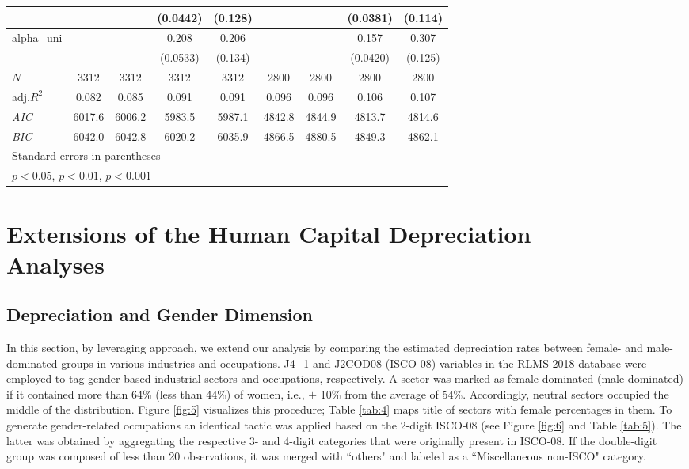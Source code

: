 \documentclass[12pt,a4paper]{article}
\numberwithin{equation}{section}
\begin{document}
\begin{table}[H]
\begin{tabular}{l*{8}{c}}
		&&&(0.0442)&(0.128)&&&(0.0381)&(0.114)\\
		\hline
		alpha\_uni&&&0.208\sym{***}&0.206&&&0.157\sym{***}&0.307\sym{*}\\
		&&&(0.0533)&(0.134)&&&(0.0420)&(0.125)\\
		\hline
		\(N\)&3312&3312&3312&3312&2800&2800&2800&2800\\
		adj.\(R^{2}\)&0.082&0.085&0.091&0.091&0.096&0.096&0.106&0.107\\
		\textit{AIC}&6017.6&6006.2&5983.5&5987.1&4842.8&4844.9&4813.7&4814.6\\
		\textit{BIC}&6042.0&6042.8&6020.2&6035.9&4866.5&4880.5&4849.3&4862.1\\
		\bottomrule
		\multicolumn{9}{l}{\footnotesize Standard errors in parentheses}\\
		\multicolumn{9}{l}{\footnotesize \sym{*} \(p<0.05\), \sym{**} \(p<0.01\), \sym{***} \(p<0.001\)}\\
	\end{tabular}
\end{table}

\section*{Extensions of the Human Capital Depreciation \\ Analyses}
\subsection*{Depreciation and Gender Dimension}

In this section, by leveraging  \citet{murillo_172._2006} approach, we extend our analysis by comparing the estimated depreciation rates between female- and male-dominated groups in various industries and occupations. J4\_1 and J2COD08 (ISCO-08) variables in the RLMS 2018 database were employed to tag gender-based industrial sectors and occupations, respectively. A sector was marked as female-dominated (male-dominated) if it contained more than 64\% (less than 44\%) of women, i.e., $\pm$ 10\% from the average of 54\%. Accordingly, neutral sectors occupied the middle of the distribution. Figure \ref{fig:5} visualizes this procedure; Table \ref{tab:4} maps title of sectors with female percentages in them. To generate gender-related occupations an identical tactic was applied based on the 2-digit ISCO-08 (see Figure \ref{fig:6} and Table \ref{tab:5}). The latter was obtained by aggregating the respective 3- and 4-digit categories that were originally present in ISCO-08. If the double-digit group was composed of less than 20 observations, it was merged with ``others" and labeled as a ``Miscellaneous non-ISCO" category.
\end{document}
